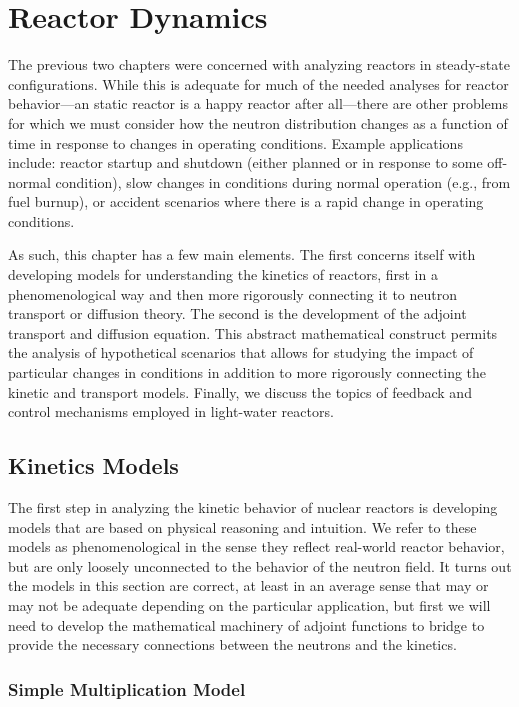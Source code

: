 \chapter{Reactor Dynamics}

The previous two chapters were concerned with analyzing reactors in steady-state configurations. While this is adequate for much of the needed analyses for reactor behavior---an static reactor is a happy reactor after all---there are other problems for which we must consider how the neutron distribution changes as a function of time in response to changes in operating conditions. Example applications include: reactor startup and shutdown (either planned or in response to some off-normal condition), slow changes in conditions during normal operation (e.g., from fuel burnup), or accident scenarios where there is a rapid change in operating conditions. 

As such, this chapter has a few main elements. The first concerns itself with developing models for understanding the kinetics of reactors, first in a phenomenological way and then more rigorously connecting it to neutron transport or diffusion theory. The second is the development of the adjoint transport and diffusion equation. This abstract mathematical construct permits the analysis of hypothetical scenarios that allows for studying the impact of particular changes in conditions in addition to more rigorously connecting the kinetic and transport models. Finally, we discuss the topics of feedback and control mechanisms employed in light-water reactors.

\section{Kinetics Models}

The first step in analyzing the kinetic behavior of nuclear reactors is developing models that are based on physical reasoning and intuition. We refer to these models as phenomenological in the sense they reflect real-world reactor behavior, but are only loosely unconnected to the behavior of the neutron field. It turns out the models in this section are correct, at least in an average sense that may or may not be adequate depending on the particular application, but first we will need to develop the mathematical machinery of adjoint functions to bridge to provide the necessary connections between the neutrons and the kinetics. 

\subsection{Simple Multiplication Model}

